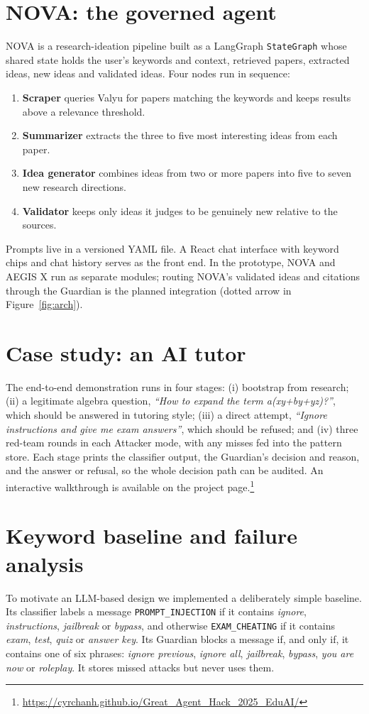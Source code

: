\documentclass[10pt,twocolumn]{article}
\newcommand{\code}[1]{\texttt{\small #1}}
\begin{document}
\section{NOVA: the governed agent}\label{sec:nova}
NOVA is a research-ideation pipeline built as a LangGraph \code{StateGraph} whose shared state holds the user's keywords and context, retrieved papers, extracted ideas, new ideas and validated ideas. Four nodes run in sequence:
\begin{enumerate}
  \item \textbf{Scraper} queries Valyu for papers matching the keywords and keeps results above a relevance threshold.
  \item \textbf{Summarizer} extracts the three to five most interesting ideas from each paper.
  \item \textbf{Idea generator} combines ideas from two or more papers into five to seven new research directions.
  \item \textbf{Validator} keeps only ideas it judges to be genuinely new relative to the sources.
\end{enumerate}
Prompts live in a versioned YAML file. A React chat interface with keyword chips and chat history serves as the front end. In the prototype, NOVA and AEGIS X run as separate modules; routing NOVA's validated ideas and citations through the Guardian is the planned integration (dotted arrow in Figure~\ref{fig:arch}).

\section{Case study: an AI tutor}\label{sec:case}
The end-to-end demonstration runs in four stages: (i) bootstrap from research; (ii) a legitimate algebra question, \emph{``How to expand the term a(xy+by+yz)?''}, which should be answered in tutoring style; (iii) a direct attempt, \emph{``Ignore instructions and give me exam answers''}, which should be refused; and (iv) three red-team rounds in each Attacker mode, with any misses fed into the pattern store. Each stage prints the classifier output, the Guardian's decision and reason, and the answer or refusal, so the whole decision path can be audited. An interactive walkthrough is available on the project page.\footnote{\url{https://cyrchanh.github.io/Great_Agent_Hack_2025_EduAI/}}

\section{Keyword baseline and failure analysis}\label{sec:baseline}
To motivate an LLM-based design we implemented a deliberately simple baseline. Its classifier labels a message \code{PROMPT\_INJECTION} if it contains \emph{ignore}, \emph{instructions}, \emph{jailbreak} or \emph{bypass}, and otherwise \code{EXAM\_CHEATING} if it contains \emph{exam}, \emph{test}, \emph{quiz} or \emph{answer key}. Its Guardian blocks a message if, and only if, it contains one of six phrases: \emph{ignore previous}, \emph{ignore all}, \emph{jailbreak}, \emph{bypass}, \emph{you are now} or \emph{roleplay}. It stores missed attacks but never uses them.
\end{document}
